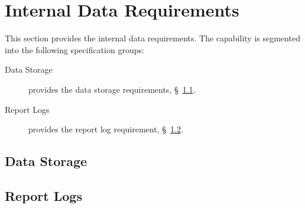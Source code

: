 \KNEADSECTIONNEWPAGE
\section{Internal Data Requirements}
\label{lab:sec_InternalData}
% 

This section provides the internal data requirements. The \ThisSys capability is segmented into the following specification groups:

\begin{description}
	\item [Data Storage] provides the data storage requirements, \S~\ref{loc:IDR_Data_Storage}.
	\item [Report Logs] provides the report log requirement, \S~\ref{loc:IDR_Report_Logs}.
\end{description}

\KNEADSUBSECTIONNEWPAGE
\subsection{Data Storage}
\label{loc:IDR_Data_Storage}




\KNEADSUBSECTIONNEWPAGE
\subsection{Report Logs}
\label{loc:IDR_Report_Logs}




